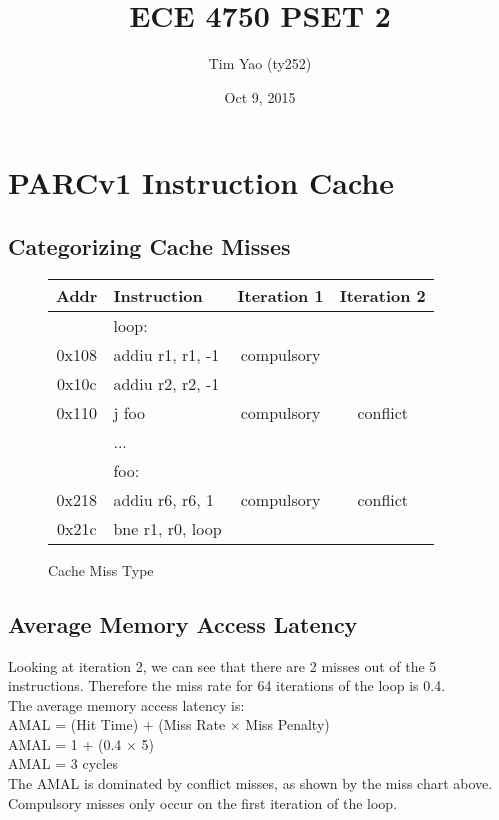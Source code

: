\documentclass[10pt]{article}
\title{ECE 4750 PSET 2}
\author{Tim Yao (ty252)}
\date{Oct 9, 2015}
\begin{document}
\maketitle
\newcommand*{\tableindent}{\hspace*{0.3cm}}%

\section{PARCv1 Instruction Cache} 
\subsection{Categorizing Cache Misses}
\begin{figure}[H]
\centering
\begin{tabular}{clcc}
\hline
\textbf{Addr} &\textbf{Instruction}& \textbf{Iteration 1} & \textbf{Iteration 2}\\
\hline
& loop: & & \\
\hline
0x108 & \tableindent addiu r1, r1, -1 & compulsory & \\
\hline
0x10c & \tableindent addiu r2, r2, -1 & 		   & \\
\hline
0x110 & \tableindent j foo			  & compulsory & conflict \\
\hline
	  & ...							  & 		   & \\
\hline
	  & foo:						  & 		   & \\
\hline
0x218 & \tableindent addiu r6, r6, 1  & compulsory & conflict \\
\hline
0x21c & \tableindent bne r1, r0, loop & 	       & \\
\hline
\end{tabular}
\caption{Cache Miss Type}
\end{figure}

\subsection{Average Memory Access Latency}
Looking at iteration 2, we can see that there are 2 misses out of the 5 instructions. Therefore the miss rate for 64 iterations of the loop is 0.4.\\
The average memory access latency is: \\
AMAL = (Hit Time) + (Miss Rate $\times$ Miss Penalty)\\
AMAL = 1 + (0.4 $\times$ 5)\\
AMAL = 3 cycles\\
The AMAL is dominated by conflict misses, as shown by the miss chart above. Compulsory misses only occur on the first iteration of the loop.
\end{document}
